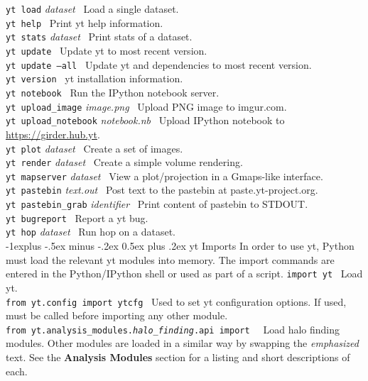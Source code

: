 \documentclass[10pt,landscape]{article}
\makeatletter
\renewcommand{\subsection}{\@startsection{subsection}{2}{0mm}%
                                {-1explus -.5ex minus -.2ex}%
                                {0.5ex plus .2ex}%
                                {\normalfont\normalsize\bfseries}}
\makeatother
\begin{document}
\begin{multicols}{3}
\texttt{yt load} \textit{dataset}   \textemdash\ Load a single dataset.  \\
\texttt{yt help} \textemdash\ Print yt help information. \\
\texttt{yt stats} \textit{dataset} \textemdash\ Print stats of a dataset. \\
\texttt{yt update} \textemdash\ Update yt to most recent version.\\
\texttt{yt update --all} \textemdash\ Update yt and dependencies to most recent version. \\
\texttt{yt version} \textemdash\ yt installation information. \\
\texttt{yt notebook} \textemdash\ Run the IPython notebook server. \\
\texttt{yt upload\_image} \textit{image.png} \textemdash\ Upload PNG image to imgur.com. \\
\texttt{yt upload\_notebook} \textit{notebook.nb} \textemdash\ Upload IPython notebook to \url{https://girder.hub.yt}.\\
\texttt{yt plot} \textit{dataset} \textemdash\ Create a set of images.\\
\texttt{yt render} \textit{dataset} \textemdash\ Create a simple
 volume rendering. \\
\texttt{yt mapserver} \textit{dataset} \textemdash\ View a plot/projection in a Gmaps-like
 interface. \\
\texttt{yt pastebin} \textit{text.out} \textemdash\ Post text to the pastebin at
 paste.yt-project.org. \\
\texttt{yt pastebin\_grab} \textit{identifier} \textemdash\ Print content of pastebin to
 STDOUT. \\
\texttt{yt bugreport} \textemdash\ Report a yt bug. \\
\texttt{yt hop} \textit{dataset} \textemdash\  Run hop on a dataset. \\

\subsection{yt Imports}
In order to use yt, Python must load the relevant yt modules into memory.
The import commands are entered in the Python/IPython shell or
used as part of a script.
\newlength{\MyLen}
\texttt{import yt}  \textemdash\
Load yt. \\
\texttt{from yt.config import ytcfg}  \textemdash\
Used to set yt configuration options.
If used, must be called before importing any other module.\\
\texttt{from yt.analysis\_modules.\emph{halo\_finding}.api import \textasteriskcentered}  \textemdash\
Load halo finding modules. Other modules
are loaded in a similar way by swapping the
\emph{emphasized} text.
See the \textbf{Analysis Modules} section for a listing and short descriptions of each.


\end{multicols}
\end{document}
